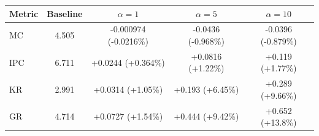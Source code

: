 \begin{tabular}{lcccc}
\toprule
Metric & Baseline & $\alpha=1$ & $\alpha=5$ & $\alpha=10$ \\
\midrule
MC & 4.505 & -0.000974 (-0.0216\%) & -0.0436 (-0.968\%) & -0.0396 (-0.879\%) \\
IPC & 6.711 & +0.0244 (+0.364\%) & +0.0816 (+1.22\%) & +0.119 (+1.77\%) \\
KR & 2.991 & +0.0314 (+1.05\%) & +0.193 (+6.45\%) & +0.289 (+9.66\%) \\
GR & 4.714 & +0.0727 (+1.54\%) & +0.444 (+9.42\%) & +0.652 (+13.8\%) \\
\bottomrule
\end{tabular}
